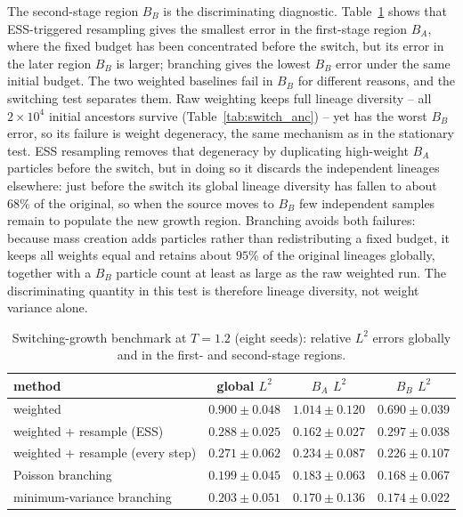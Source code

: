 \documentclass[a4paper,fleqn]{cas-sc}
\theoremstyle{definition}
\theoremstyle{remark}
\begin{document}
The second-stage region \(B_B\) is the discriminating diagnostic.  Table~\ref{tab:switch}
shows that ESS-triggered resampling gives the smallest error in the first-stage region
\(B_A\), where the fixed budget has been concentrated before the switch, but its error in
the later region \(B_B\) is larger; branching gives the lowest \(B_B\) error under the same
initial budget.  The two weighted baselines fail in \(B_B\) for different reasons, and the
switching test separates them.  Raw weighting keeps full lineage diversity -- all
\(2\times10^4\) initial ancestors survive (Table~\ref{tab:switch_anc}) -- yet has the worst
\(B_B\) error, so its failure is weight degeneracy, the same mechanism as in the stationary
test.  ESS resampling removes that degeneracy by duplicating high-weight \(B_A\) particles
before the switch, but in doing so it discards the independent lineages elsewhere: just
before the switch its global lineage diversity has fallen to about \(68\%\) of the original,
so when the source moves to \(B_B\) few independent samples remain to populate the new
growth region.  Branching avoids both failures: because mass creation adds particles rather
than redistributing a fixed budget, it keeps all weights equal and retains about \(95\%\) of
the original lineages globally, together with a \(B_B\) particle count at least as large as
the raw weighted run.  The discriminating quantity in this test is therefore lineage
diversity, not weight variance alone.
 
\begin{table}[t]
\centering
\caption{Switching-growth benchmark at \(T=1.2\) (eight seeds): relative \(L^2\) errors globally and in the first- and second-stage regions.}
\label{tab:switch}
\begin{tabular}{l c c c }
\toprule
method & global \(L^2\) & \(B_A\) \(L^2\) & \(B_B\) \(L^2\)   \\
\midrule
weighted & \(0.900\pm0.048\) & \(1.014\pm0.120\) & \(0.690\pm0.039\)  \\
weighted + resample (ESS) & \(0.288\pm0.025\) & \(\mathbf{0.162\pm0.027}\) & \(0.297\pm0.038\) \\
weighted + resample (every step) & \(0.271\pm0.062\) & \(0.234\pm0.087\) & \(0.226\pm0.107\)  \\
Poisson branching & \(\mathbf{0.199\pm0.045}\) & \(0.183\pm0.063\) & \(\mathbf{0.168\pm0.067}\)  \\
minimum-variance branching & \(0.203\pm0.051\) & \(0.170\pm0.136\) & \(0.174\pm0.022\)   \\
\bottomrule
\end{tabular}
\end{table}
 
\end{document}

